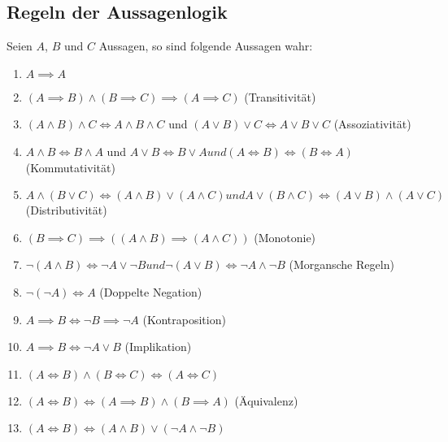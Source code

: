 \documentclass[../main.tex]{subfiles}
\begin{document}
\subsection{Regeln der Aussagenlogik}
Seien $A$, $B$ und $C$ Aussagen, so sind folgende Aussagen wahr:
            \begin{enumerate}
                \item $A\implies A$
                \item $(A\implies B) \land (B \implies C)\implies (A\implies C)$ (Transitivität)
                \item$(A\land B)\land C \iff A\land B\land C$ und $(A\lor B)\lor C \iff A\lor B\lor C$ (Assoziativität)
                \item $A\land B \iff B\land A$ und $A\lor B \iff B\lor A und (A\iff B) \iff (B\iff A)$ (Kommutativität)
                \item $A\land (B\lor C)\iff (A\land B) \lor (A\land C) und A\lor (B\land C)\iff (A\lor B) \land (A\lor C)$ (Distributivität)
                \item $(B\implies C)\implies ((A\land B)\implies (A \land C))$  (Monotonie)
                \item $\lnot (A\land B)\iff \lnot A\lor \lnot B und \lnot (A\lor B)\iff \lnot A\land \lnot B$  (Morgansche Regeln)
                \item $\lnot(\lnot A)\iff A$ (Doppelte Negation)
		\item $A\implies B \iff \lnot B\implies \lnot A$ (Kontraposition)
  		\item $A\implies B \iff \lnot A\lor B$ (Implikation)
    		\item $(A\iff B) \land (B\iff C) \iff (A\iff C)$
      		\item $(A\iff B) \iff (A\implies B)\land (B\implies A)$ (Äquivalenz)
		\item $(A\iff B) \iff (A\land B)\lor (\lnot A\land \lnot B)$

            \end{enumerate}
\end{document}

